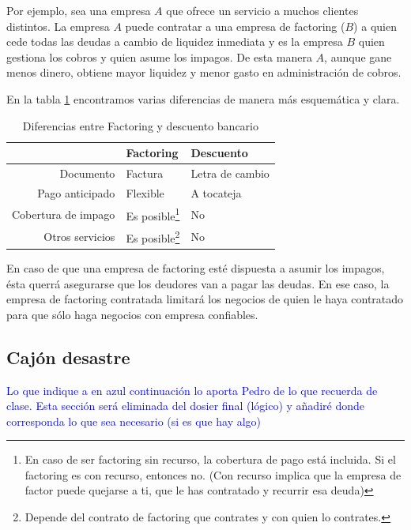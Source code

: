 \documentclass[nochap,palatino,shortheader]{apuntes}
\newcommand{\study}[1]{#1} \newcommand{\substudy}[1]{#1}
\begin{document}
Por ejemplo, sea una empresa $A$ que ofrece un servicio a muchos clientes distintos. La empresa $A$ puede contratar a una empresa de factoring ($B$) a quien cede todas las deudas a cambio de liquidez inmediata y es la empresa $B$ quien gestiona los cobros y quien asume los impagos. De esta manera $A$, aunque gane menos dinero,  obtiene mayor liquidez y menor gasto en administración de cobros.


En la tabla \ref{tab:FactoringVsDescuento} encontramos varias diferencias de manera más esquemática y clara.

\begin{table}[hbtp]
\centering
\begin{tabular}{|r||l|l|}
\hline
&\textbf{Factoring} &\textbf{Descuento} \\
\hline\hline
Documento & Factura & Letra de cambio\\
Pago anticipado & Flexible & A tocateja\\
Cobertura de impago & Es posible\footnote{En caso de ser factoring sin recurso, la cobertura de pago está incluida. Si el factoring es con recurso, entonces no. (Con recurso implica que la empresa de factor puede quejarse a ti, que le has contratado y recurrir esa deuda)} & No\\
Otros servicios & Es posible\footnote{Depende del contrato de factoring que contrates y con quien lo contrates.} & No\\
\hline
\end{tabular}
\label{tab:FactoringVsDescuento}
\caption{\study{Diferencias entre Factoring y descuento bancario}}
\end{table}

\obs En caso de que una empresa de factoring esté dispuesta a asumir los impagos, ésta querrá asegurarse que los deudores van a pagar las deudas.
En ese caso, la empresa de factoring contratada limitará los negocios de quien le haya contratado para que sólo haga negocios con empresa confiables.


\subsection{Cajón desastre}

\textcolor{blue}{Lo que indique a en azul continuación lo aporta Pedro de lo que recuerda de clase. Esta sección será eliminada del dosier final (lógico) y añadiré donde corresponda lo que sea necesario (si es que hay algo)}
\end{document}
